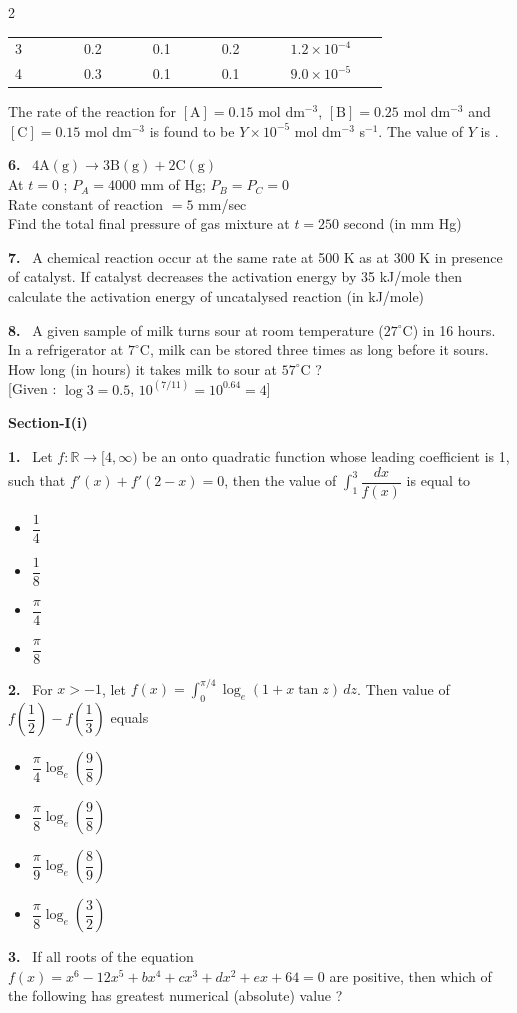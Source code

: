 \documentclass[10pt]{extarticle}
\newcommand{\partsec}[2]{\par\medskip\noindent{\large\bfseries PART-#1: #2}\par\smallskip}
\newcommand{\sect}[1]{\par\smallskip\noindent\textbf{#1}\par}
\newcommand{\qn}[1]{\par\smallskip\noindent\textbf{#1.}~}
\newenvironment{qoptions}{\begin{itemize}[leftmargin=1.8em,itemsep=1pt,topsep=2pt,label={}]}{\end{itemize}}
\newcommand{\opt}[2]{\item[(#1)] #2}
\begin{document}
\begin{multicols}{2}
\begin{minipage}{\linewidth}
\begin{center}
\begin{tabular}{|p{0.14\linewidth}|p{0.14\linewidth}|p{0.14\linewidth}|p{0.14\linewidth}|p{0.2\linewidth}|}
3 & 0.2 & 0.1 & 0.2 & $1.2\times10^{-4}$\\
4 & 0.3 & 0.1 & 0.1 & $9.0\times10^{-5}$\\
\hline
\end{tabular}
\end{center}
The rate of the reaction for $[\mathrm A]=0.15$ mol dm$^{-3}$, $[\mathrm B]=0.25$ mol dm$^{-3}$ and $[\mathrm C]=0.15$ mol dm$^{-3}$ is found to be $Y\times10^{-5}$ mol dm$^{-3}$ s$^{-1}$. The value of $Y$ is \underline{\hspace{1.5cm}}.
\end{minipage}
\qn{6} $4\mathrm{A(g)}\to3\mathrm{B(g)}+2\mathrm{C(g)}$\\
At $t=0$ ; $P_A=4000$ mm of Hg; $P_B=P_C=0$\\
Rate constant of reaction $=5$ mm/sec\\
Find the total final pressure of gas mixture at $t=250$ second (in mm Hg)
\qn{7} A chemical reaction occur at the same rate at 500 K as at 300 K in presence of catalyst. If catalyst decreases the activation energy by 35 kJ/mole then calculate the activation energy of uncatalysed reaction (in kJ/mole)
\qn{8} A given sample of milk turns sour at room temperature ($27^\circ$C) in 16 hours. In a refrigerator at $7^\circ$C, milk can be stored three times as long before it sours. How long (in hours) it takes milk to sour at $57^\circ$C ?\\{[}Given : $\log3=0.5$, $10^{(7/11)}=10^{0.64}=4$]
\partsec{3}{MATHEMATICS}
\sect{Section-I(i)}
\qn{1} Let $f:\mathbb R\to[4,\infty)$ be an onto quadratic function whose leading coefficient is 1, such that $f'(x)+f'(2-x)=0$, then the value of $\displaystyle\int_1^3\dfrac{dx}{f(x)}$ is equal to
\begin{qoptions}
\opt{A}{$\dfrac14$}
\opt{B}{$\dfrac18$}
\opt{C}{$\dfrac\pi4$}
\opt{D}{$\dfrac\pi8$}
\end{qoptions}
\qn{2} For $x>-1$, let $f(x)=\displaystyle\int_0^{\pi/4}\log_e(1+x\tan z)\,dz$. Then value of $f\left(\dfrac12\right)-f\left(\dfrac13\right)$ equals
\begin{qoptions}
\opt{A}{$\dfrac\pi4\log_e\left(\dfrac98\right)$}
\opt{B}{$\dfrac\pi8\log_e\left(\dfrac98\right)$}
\opt{C}{$\dfrac\pi9\log_e\left(\dfrac89\right)$}
\opt{D}{$\dfrac\pi8\log_e\left(\dfrac32\right)$}
\end{qoptions}
\qn{3} If all roots of the equation $f(x)=x^6-12x^5+bx^4+cx^3+dx^2+ex+64=0$ are positive, then which of the following has greatest numerical (absolute) value ?
\begin{qoptions}

\end{qoptions}
\end{multicols}
\end{document}
